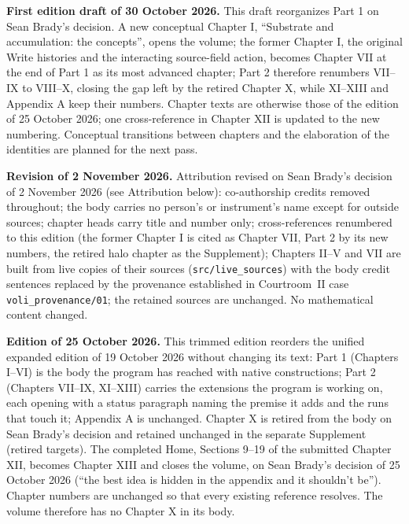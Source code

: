 \noindent\textbf{First edition draft of 30 October 2026.} This draft reorganizes Part 1 on Sean Brady's decision. A new conceptual Chapter I, ``Substrate and accumulation: the concepts'', opens the volume; the former Chapter I, the original Write histories and the interacting source-field action, becomes Chapter VII at the end of Part 1 as its most advanced chapter; Part 2 therefore renumbers VII--IX to VIII--X, closing the gap left by the retired Chapter X, while XI--XIII and Appendix A keep their numbers. Chapter texts are otherwise those of the edition of 25 October 2026; one cross-reference in Chapter XII is updated to the new numbering. Conceptual transitions between chapters and the elaboration of the identities are planned for the next pass.\par\vspace{0.1in}
\noindent\textbf{Revision of 2 November 2026.} Attribution revised on Sean Brady's decision of 2 November 2026 (see Attribution below): co-authorship credits removed throughout; the body carries no person's or instrument's name except for outside sources; chapter heads carry title and number only; cross-references renumbered to this edition (the former Chapter I is cited as Chapter VII, Part 2 by its new numbers, the retired halo chapter as the Supplement); Chapters II--V and VII are built from live copies of their sources (\texttt{src/live\_sources}) with the body credit sentences replaced by the provenance established in Courtroom~II case \texttt{voli\_provenance/01}; the retained sources are unchanged. No mathematical content changed.

\noindent\textbf{Edition of 25 October 2026.} This trimmed edition reorders the unified expanded edition of 19 October 2026 without changing its text: Part 1 (Chapters I--VI) is the body the program has reached with native constructions; Part 2 (Chapters VII--IX, XI--XIII) carries the extensions the program is working on, each opening with a status paragraph naming the premise it adds and the runs that touch it; Appendix A is unchanged. Chapter X is retired from the body on Sean Brady's decision and retained unchanged in the separate Supplement (retired targets). The completed Home, Sections 9--19 of the submitted Chapter XII, becomes Chapter XIII and closes the volume, on Sean Brady's decision of 25 October 2026 (``the best idea is hidden in the appendix and it shouldn't be''). Chapter numbers are unchanged so that every existing reference resolves. The volume therefore has no Chapter X in its body.
\vspace{0.15in}

